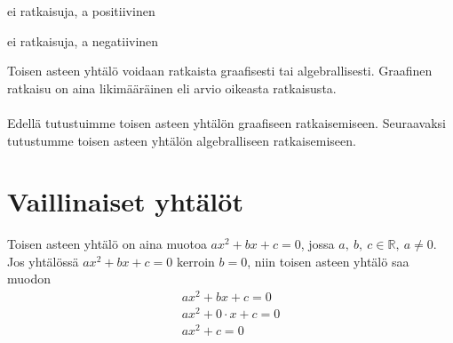 \begin{lukusuora}{-2}{2}{4}
\end{lukusuora}

ei ratkaisuja, a positiivinen

\begin{lukusuora}{-2}{2}{4}
\end{lukusuora}

ei ratkaisuja, a negatiivinen

\begin{lukusuora}{-2}{2}{4}
\end{lukusuora}

Toisen asteen yhtälö voidaan ratkaista graafisesti tai algebrallisesti. Graafinen ratkaisu on aina likimääräinen eli arvio oikeasta ratkaisusta. \\ \\ Edellä tutustuimme toisen asteen yhtälön graafiseen ratkaisemiseen. Seuraavaksi tutustumme toisen asteen yhtälön algebralliseen ratkaisemiseen.
\section{Vaillinaiset yhtälöt}
Toisen asteen yhtälö on aina muotoa $ax^2+bx+c=0$, jossa $a, \ b, \ c \in \mathbb{R}, \ a \neq 0$. \\
Jos yhtälössä $ax^2+bx+c=0$ kerroin $b=0$, niin toisen asteen yhtälö saa muodon
\begin{align*}
ax^2+bx+c=0 \\
ax^2+0 \cdot x+c=0 \\
ax^2+c=0
\end{align*}
